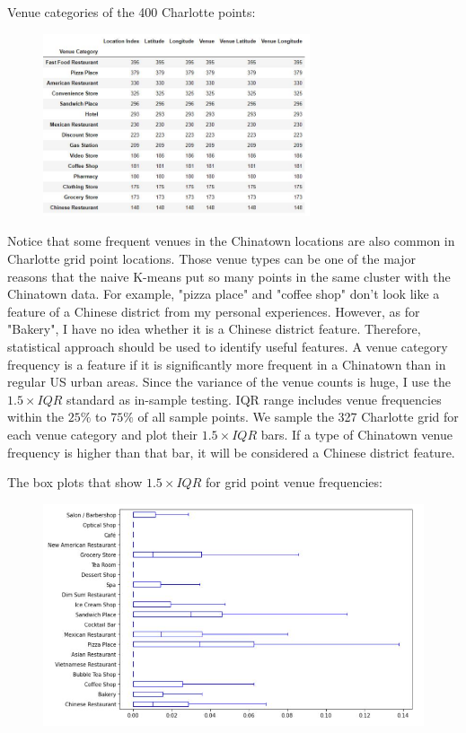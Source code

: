\documentclass{article}
\begin{document}
Venue categories of the 400 Charlotte points:
\begin{figure}[h!]
\includegraphics[width=0.7\textwidth]{csp2.jpg}
\centering
\end{figure}

Notice that some frequent venues in the Chinatown locations are also common in Charlotte grid point locations.
Those venue types can be one of the major reasons that the naive K-means put so many points in the same cluster with the Chinatown data.
For example, "pizza place" and "coffee shop" don't look like a feature of a Chinese district from my personal experiences.
However, as for "Bakery", I have no idea whether it is a Chinese district feature.
Therefore, statistical approach should be used to identify useful features.
A venue category frequency is a feature if it is significantly more frequent in a Chinatown than in regular US urban areas.
Since the variance of the venue counts is huge, I use the $1.5 \times IQR$ standard as in-sample testing.
IQR range includes venue frequencies within the $25\%$ to $75\%$ of all sample points.
We sample the 327 Charlotte grid for each venue category and plot their $1.5 \times IQR$ bars. 
If a type of Chinatown venue frequency is higher than that bar, it will be considered a Chinese district feature.

The box plots that show $1.5 \times IQR$ for grid point venue frequencies:
\begin{figure}[h!]
\includegraphics[width=1.0\textwidth]{cn2.jpg}
\centering
\end{figure}
\end{document}
